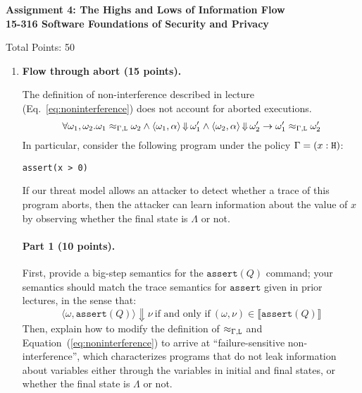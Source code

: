 \documentclass[10pt]{article}
\begin{document}
\begin{center}
\textbf{ Assignment 4: The Highs and Lows of Information Flow\\15-316 Software Foundations of Security and Privacy}\\
\end{center}
Total Points: 50

\vspace{-5mm}

\begin{enumerate}

\item \textbf{Flow through abort (15 points).}

The definition of non-interference described in lecture (Eq.~\ref{eq:noninterference}) does not account for aborted executions.
\begin{equation}
\label{eq:noninterference}
\forall \omega_1,\omega_2 . \omega_1 \approx_{\Gamma,\lowsec} \omega_2 \land 
\langle \omega_1, \asprg\rangle \bigstep \omega_1' \land 
\langle \omega_2, \asprg\rangle \bigstep \omega_2'
\limply
\omega_1' \approx_{\Gamma,\lowsec} \omega_2'
\end{equation}
In particular, consider the following program under the policy $\Gamma = (x : \texttt{\upshape H})$:
\begin{lstlisting}[escapechar=\#]
assert(x > 0)
\end{lstlisting}
If our threat model allows an attacker to detect whether a trace of this program aborts, then the attacker can learn information about the value of $x$ by observing whether the final state is $\Lambda$ or not.

\paragraph{Part 1 (10 points).}
First, provide a big-step semantics for the $\mathtt{assert}(Q)$ command; your semantics should match the trace semantics for $\mathtt{assert}$ given in prior lectures, in the sense that:
\[
\langle \omega, \mathtt{assert}(Q)\rangle \Downarrow \nu
~\text{if and only if}~
(\omega, \nu) \in \llbracket\mathtt{assert}(Q)\rrbracket
\]
Then, explain how to modify the definition of $\approx_{\Gamma,\texttt{\upshape L}}$ and Equation~(\ref{eq:noninterference}) to arrive at ``failure-sensitive non-interference'', which characterizes programs that do not leak information about \hisec variables either through the \lowsec variables in initial and final states, or whether the final state is $\Lambda$ or not.


\end{enumerate}
\end{document}
